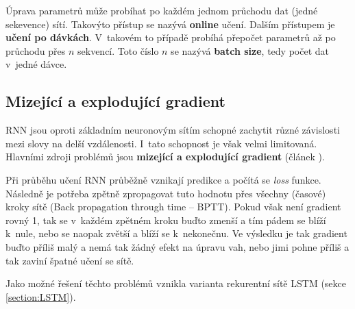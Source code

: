 Úprava parametrů může probíhat po každém jednom průchodu dat (jedné sekevence) sítí. Takovýto přístup se nazývá \textbf{online} učení. Dalším přístupem je \textbf{učení po dávkách}. V~takovém to případě probíhá přepočet parametrů až po průchodu přes $n$ sekvencí. Toto číslo $n$ se nazývá \textbf{batch size}, tedy počet dat  v~jedné dávce.

%
%
%


\subsection{Mizející a explodující gradient} \label{subsection:gradient}
RNN jsou oproti základním neuronovým sítím schopné zachytit různé závislosti mezi slovy na delší vzdálenosti. I~tato schopnost je však velmi limitovaná. Hlavními zdroji problémů jsou \textbf{mizející a explodující gradient} (článek \cite{gradientProblems}).


Při průběhu učení RNN průběžně vznikají predikce a počítá se \emph{loss} funkce. Následně je potřeba zpětně zpropagovat tuto hodnotu přes všechny (časové) kroky sítě (Back propagation through time -- BPTT). Pokud však není gradient rovný 1, tak se v~každém zpětném kroku buďto zmenší a tím pádem se blíží k~nule, nebo se naopak zvětší a blíží se k~nekonečnu. Ve výsledku je tak gradient buďto příliš malý a nemá tak žádný efekt na úpravu vah, nebo jimi pohne příliš a tak zaviní špatné učení se sítě.

Jako možné řešení těchto problémů vznikla varianta rekurentní sítě LSTM (sekce \ref{section:LSTM}).


